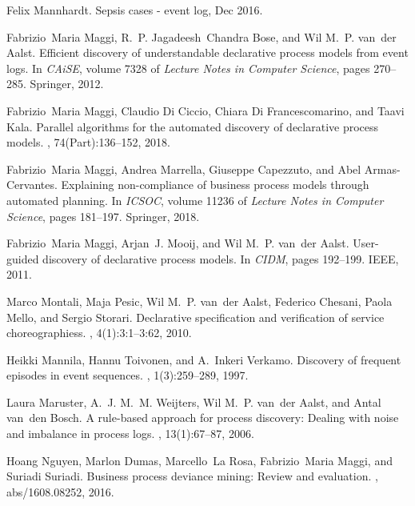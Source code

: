\documentclass[a4wide,11pt]{article}
\theoremstyle{definition}
\theoremstyle{plain}
\begin{document}
\begin{thebibliography}{MWvdAvdB06}
Felix Mannhardt.
\newblock Sepsis cases - event log, Dec 2016.

Fabrizio~Maria Maggi, R.~P. Jagadeesh~Chandra Bose, and Wil M.~P. van~der
  Aalst.
\newblock Efficient discovery of understandable declarative process models from
  event logs.
\newblock In {\em CAiSE}, volume 7328 of {\em Lecture Notes in Computer
  Science}, pages 270--285. Springer, 2012.

Fabrizio~Maria Maggi, Claudio {Di Ciccio}, Chiara {Di Francescomarino}, and
  Taavi Kala.
\newblock Parallel algorithms for the automated discovery of declarative
  process models.
, 74(Part):136--152, 2018.

Fabrizio~Maria Maggi, Andrea Marrella, Giuseppe Capezzuto, and Abel
  Armas{-}Cervantes.
\newblock Explaining non-compliance of business process models through
  automated planning.
\newblock In {\em {ICSOC}}, volume 11236 of {\em Lecture Notes in Computer
  Science}, pages 181--197. Springer, 2018.

Fabrizio~Maria Maggi, Arjan~J. Mooij, and Wil M.~P. van~der Aalst.
\newblock User-guided discovery of declarative process models.
\newblock In {\em {CIDM}}, pages 192--199. {IEEE}, 2011.

Marco Montali, Maja Pesic, Wil M.~P. van~der Aalst, Federico Chesani, Paola
  Mello, and Sergio Storari.
\newblock Declarative specification and verification of service
  choreographiess.
, 4(1):3:1--3:62, 2010.

Heikki Mannila, Hannu Toivonen, and A.~Inkeri Verkamo.
\newblock Discovery of frequent episodes in event sequences.
, 1(3):259--289, 1997.

Laura Maruster, A.~J. M.~M. Weijters, Wil M.~P. van~der Aalst, and Antal
  van~den Bosch.
\newblock A rule-based approach for process discovery: Dealing with noise and
  imbalance in process logs.
, 13(1):67--87, 2006.

Hoang Nguyen, Marlon Dumas, Marcello~La Rosa, Fabrizio~Maria Maggi, and Suriadi
  Suriadi.
\newblock Business process deviance mining: Review and evaluation.
, abs/1608.08252, 2016.


\end{thebibliography}
\end{document}

